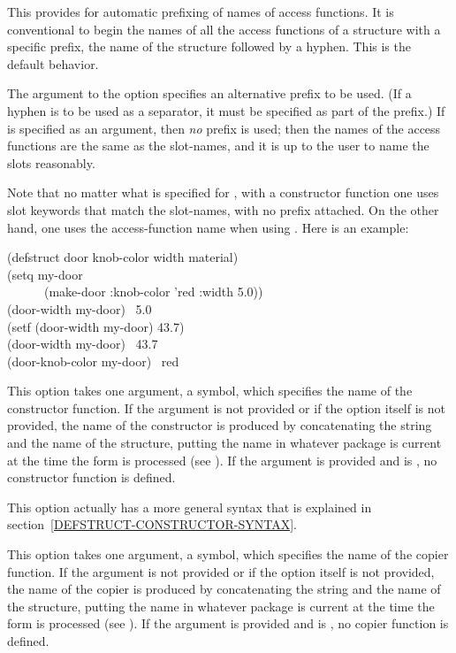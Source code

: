 \begin{flushdesc}
\item[\cd{:conc-name}]
This provides for automatic prefixing of names of access functions.
It is conventional to begin the names of all the access functions of
a structure with a specific prefix,
the name of the structure followed by a hyphen.
This is the default behavior.

The argument to the  option specifies an alternative
prefix to be used.  (If a hyphen is to be used as a separator,
it must be specified as part of the prefix.)
If {\false} is specified as an argument, then \emph{no} prefix is used;
then the names of the access functions
are the same as the slot-names, and it is up to the user
to name the slots reasonably.

Note that no matter what is specified for ,
with a constructor function one uses
slot keywords that match the slot-names, with no prefix attached.
On the other hand, one uses the access-function name
when using .  Here is an example:
\begin{lisp}
(defstruct door knob-color width material) \\
(setq my-door \\
~~~~~~(make-door :knob-color 'red :width 5.0)) \\
(door-width my-door) \EV\ 5.0 \\
(setf (door-width my-door) 43.7) \\
(door-width my-door) \EV\ 43.7 \\
(door-knob-color my-door) \EV\ red
\end{lisp}

\item[\cd{:constructor}]
This option takes one argument, a symbol,
which specifies the name of the constructor
function.  If the argument is not provided or if the option itself is not
provided, the name of the constructor is produced by concatenating the
string  and the name of the structure, putting the name
in whatever package is current at the time the 
form is processed (see ).
If the argument is
provided and is {\false}, no constructor function is defined.

This option actually has a more general syntax that is explained
in section~\ref{DEFSTRUCT-CONSTRUCTOR-SYNTAX}.

\item[\cd{:copier}]
This option takes one argument, a symbol,
which specifies the name of the copier
function.  If the argument is not provided or if the option itself is not
provided, the name of the copier is produced by concatenating the
string  and the name of the structure, putting the name
in whatever package is current at the time the 
form is processed (see ).
If the argument is provided and is {\false}, no copier function is defined.


\end{flushdesc}

